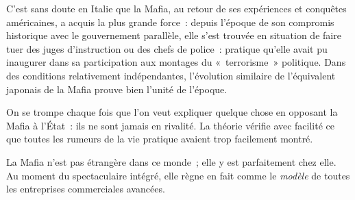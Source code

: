 \documentclass[french,twoside]{book} %
\def\mednobreak{\ifdim\lastskip<\medskipamount
  \removelastskip\nopagebreak\medskip\fi}
\newcommand{\labelblock}[1]{\medbreak{\noindent\color{rubric}\bfseries #1}\par\mednobreak}
\begin{document}
C’est sans doute en Italie que la Mafia, au retour de ses expériences et conquêtes américaines, a acquis la plus grande force : depuis l’époque de son compromis historique avec le gouvernement parallèle, elle s’est trouvée en situation de faire tuer des juges d’instruction ou des chefs de police : pratique qu’elle avait pu inaugurer dans sa participation aux montages du « terrorisme » politique. Dans des conditions relativement indépendantes, l’évolution similaire de l’équivalent japonais de la Mafia prouve bien l’unité de l’époque.\par
On se trompe chaque fois que l’on veut expliquer quelque chose en opposant la Mafia à l’État : ils ne sont jamais en rivalité. La théorie vérifie avec facilité ce que toutes les rumeurs de la vie pratique avaient trop facilement montré.\par
La Mafia n’est pas étrangère dans ce monde ; elle y est parfaitement chez elle. Au moment du spectaculaire intégré, elle règne en fait comme le \emph{modèle} de toutes les entreprises commerciales avancées.\par

\labelblock{XXV}
\end{document}
